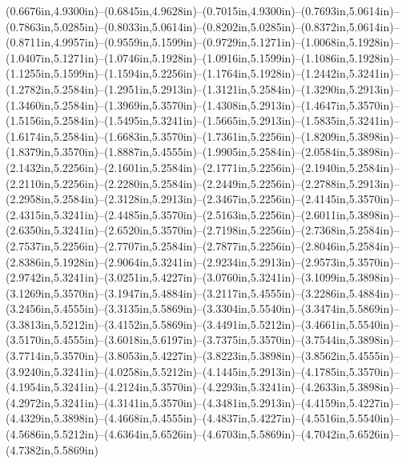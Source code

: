 (0.6676in,4.9300in)--(0.6845in,4.9628in)--(0.7015in,4.9300in)--(0.7693in,5.0614in)--(0.7863in,5.0285in)--(0.8033in,5.0614in)--(0.8202in,5.0285in)--(0.8372in,5.0614in)--(0.8711in,4.9957in)--(0.9559in,5.1599in)--(0.9729in,5.1271in)--(1.0068in,5.1928in)--(1.0407in,5.1271in)--(1.0746in,5.1928in)--(1.0916in,5.1599in)--(1.1086in,5.1928in)--(1.1255in,5.1599in)--(1.1594in,5.2256in)--(1.1764in,5.1928in)--(1.2442in,5.3241in)--(1.2782in,5.2584in)--(1.2951in,5.2913in)--(1.3121in,5.2584in)--(1.3290in,5.2913in)--(1.3460in,5.2584in)--(1.3969in,5.3570in)--(1.4308in,5.2913in)--(1.4647in,5.3570in)--(1.5156in,5.2584in)--(1.5495in,5.3241in)--(1.5665in,5.2913in)--(1.5835in,5.3241in)--(1.6174in,5.2584in)--(1.6683in,5.3570in)--(1.7361in,5.2256in)--(1.8209in,5.3898in)--(1.8379in,5.3570in)--(1.8887in,5.4555in)--(1.9905in,5.2584in)--(2.0584in,5.3898in)--(2.1432in,5.2256in)--(2.1601in,5.2584in)--(2.1771in,5.2256in)--(2.1940in,5.2584in)--(2.2110in,5.2256in)--(2.2280in,5.2584in)--(2.2449in,5.2256in)--(2.2788in,5.2913in)--(2.2958in,5.2584in)--(2.3128in,5.2913in)--(2.3467in,5.2256in)--(2.4145in,5.3570in)--(2.4315in,5.3241in)--(2.4485in,5.3570in)--(2.5163in,5.2256in)--(2.6011in,5.3898in)--(2.6350in,5.3241in)--(2.6520in,5.3570in)--(2.7198in,5.2256in)--(2.7368in,5.2584in)--(2.7537in,5.2256in)--(2.7707in,5.2584in)--(2.7877in,5.2256in)--(2.8046in,5.2584in)--(2.8386in,5.1928in)--(2.9064in,5.3241in)--(2.9234in,5.2913in)--(2.9573in,5.3570in)--(2.9742in,5.3241in)--(3.0251in,5.4227in)--(3.0760in,5.3241in)--(3.1099in,5.3898in)--(3.1269in,5.3570in)--(3.1947in,5.4884in)--(3.2117in,5.4555in)--(3.2286in,5.4884in)--(3.2456in,5.4555in)--(3.3135in,5.5869in)--(3.3304in,5.5540in)--(3.3474in,5.5869in)--(3.3813in,5.5212in)--(3.4152in,5.5869in)--(3.4491in,5.5212in)--(3.4661in,5.5540in)--(3.5170in,5.4555in)--(3.6018in,5.6197in)--(3.7375in,5.3570in)--(3.7544in,5.3898in)--(3.7714in,5.3570in)--(3.8053in,5.4227in)--(3.8223in,5.3898in)--(3.8562in,5.4555in)--(3.9240in,5.3241in)--(4.0258in,5.5212in)--(4.1445in,5.2913in)--(4.1785in,5.3570in)--(4.1954in,5.3241in)--(4.2124in,5.3570in)--(4.2293in,5.3241in)--(4.2633in,5.3898in)--(4.2972in,5.3241in)--(4.3141in,5.3570in)--(4.3481in,5.2913in)--(4.4159in,5.4227in)--(4.4329in,5.3898in)--(4.4668in,5.4555in)--(4.4837in,5.4227in)--(4.5516in,5.5540in)--(4.5686in,5.5212in)--(4.6364in,5.6526in)--(4.6703in,5.5869in)--(4.7042in,5.6526in)--(4.7382in,5.5869in) 